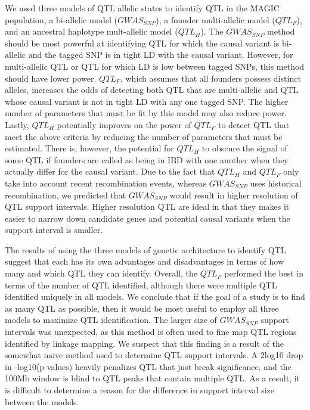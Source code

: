 \documentclass[article,9pt,twocolumn,twoside]{rilabRxiv}
\begin{document}
We used three models of QTL allelic states to identify QTL in the MAGIC population, a bi-allelic model ($GWAS_{SNP}$), a founder multi-allelic model ($QTL_F$), and an ancestral haplotype mult-allelic model ($QTL_H$).
The $GWAS_{SNP}$ method should be most powerful at identifying QTL for which the causal variant is bi-allelic and the tagged SNP is in tight LD with the causal variant.
However, for multi-allelic QTL or QTL for which LD is low between tagged SNPs, this method should have lower power.
$QTL_F$, which assumes that all founders possess distinct alleles, increases the odds of detecting both QTL that are multi-allelic and QTL whose causal variant is not in tight LD with any one tagged SNP.
The higher number of parameters that must be fit by this model may also reduce power.
Lastly, $QTL_H$ potentially improves on the power of $QTL_F$ to detect QTL that meet the above criteria by reducing the number of parameters that must be estimated.
There is, however, the potential for $QTL_H$ to obscure the signal of some QTL if founders are called as being in IBD with one another when they actually differ for the causal variant.
Due to the fact that $QTL_H$ and $QTL_F$ only take into account recent recombination events, whereas $GWAS_{SNP}$ uses historical recombination, we predicted that $GWAS_{SNP}$ would result in higher resolution of QTL support intervals. Higher resolution QTL are ideal in that they makes it easier to narrow down candidate genes and potential causal variants when the support interval is smaller.

The results of using the three models of genetic architecture to identify QTL suggest that each has its own advantages and disadvantages in terms of how many and which QTL they can identify.
Overall, the $QTL_F$ performed the best in terms of the number of QTL identified, although there were multiple QTL identified uniquely in all models.
We conclude that if the goal of a study is to find as many QTL as possible, then it would be most useful to employ all three models to maximize QTL identification.
The larger size of $GWAS_{SNP}$ support intervals was unexpected, as this method is often used to fine map QTL regions identified by linkage mapping.
We suspect that this finding is a result of the somewhat naive method used to determine QTL support intervals.
A 2log10 drop in -log10(p-values) heavily penalizes QTL that just break significance, and the 100Mb window is blind to QTL peaks that contain multiple QTL.
As a result, it is difficult to determine a reason for the difference in support interval size between the models.
\end{document}
